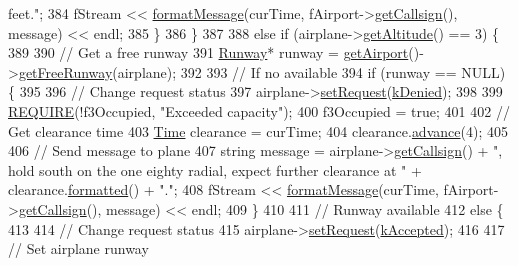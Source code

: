 \begin{DoxyCode}
{       feet."};
384             fStream << \hyperlink{classATC_a2fca67fc154c7d8a6c14198697653059}{formatMessage}(curTime, fAirport->\hyperlink{classAirport_a6ed56e05a8c881b8e4718a34ba9cccc5}{getCallsign}(), message) << 
      endl;
385         \}
386     \}
387 
388     \textcolor{keywordflow}{else} \textcolor{keywordflow}{if} (airplane->\hyperlink{classAirplane_ad2550909ab563f7df850f79f23c3a308}{getAltitude}() == 3) \{
389 
390         \textcolor{comment}{// Get a free runway}
391         \hyperlink{classRunway}{Runway}* runway = \hyperlink{classATC_a6fb413edf7b32e9caa989eaf14db7eb7}{getAirport}()->\hyperlink{classAirport_a760fd9c19e06fa37362006e42153ca0a}{getFreeRunway}(airplane);
392 
393         \textcolor{comment}{// If no available}
394         \textcolor{keywordflow}{if} (runway == NULL) \{
395 
396             \textcolor{comment}{// Change request status}
397             airplane->\hyperlink{classAirplane_affcc5325670824881ccc1524223aa209}{setRequest}(\hyperlink{Airplane_8h_a4a8a3f45932bdf601f093bea061bad9baac195c08fab2dff9d0520caf49ea4e11}{kDenied});
398 
399             \hyperlink{DesignByContract_8h_aeb774672b46dbe80afc14e0d1970f017}{REQUIRE}(!f3Occupied, \textcolor{stringliteral}{"Exceeded capacity"});
400             f3Occupied = \textcolor{keyword}{true};
401 
402             \textcolor{comment}{// Get clearance time}
403             \hyperlink{classTime}{Time} clearance = curTime;
404             clearance.\hyperlink{classTime_a41c94422f10c95daab849b9c20afdeba}{advance}(4);
405 
406             \textcolor{comment}{// Send message to plane}
407             \textcolor{keywordtype}{string} message = airplane->\hyperlink{classAirplane_a6a62bd06d28789336c5ce1543d9391f1}{getCallsign}() + \textcolor{stringliteral}{", hold south on the one eighty radial,
       expect further clearance at "} + clearance.\hyperlink{classTime_aeeb2d2b5a624d0d78b7f5d146d0682f5}{formatted}() + \textcolor{stringliteral}{"."};
408             fStream << \hyperlink{classATC_a2fca67fc154c7d8a6c14198697653059}{formatMessage}(curTime, fAirport->\hyperlink{classAirport_a6ed56e05a8c881b8e4718a34ba9cccc5}{getCallsign}(), message) << 
      endl;
409         \}
410 
411         \textcolor{comment}{// Runway available}
412         \textcolor{keywordflow}{else} \{
413 
414             \textcolor{comment}{// Change request status}
415             airplane->\hyperlink{classAirplane_affcc5325670824881ccc1524223aa209}{setRequest}(\hyperlink{Airplane_8h_a4a8a3f45932bdf601f093bea061bad9ba15597ea7f444a937d40b39b9ea99dd1d}{kAccepted});
416 
417             \textcolor{comment}{// Set airplane runway}

\end{DoxyCode}
